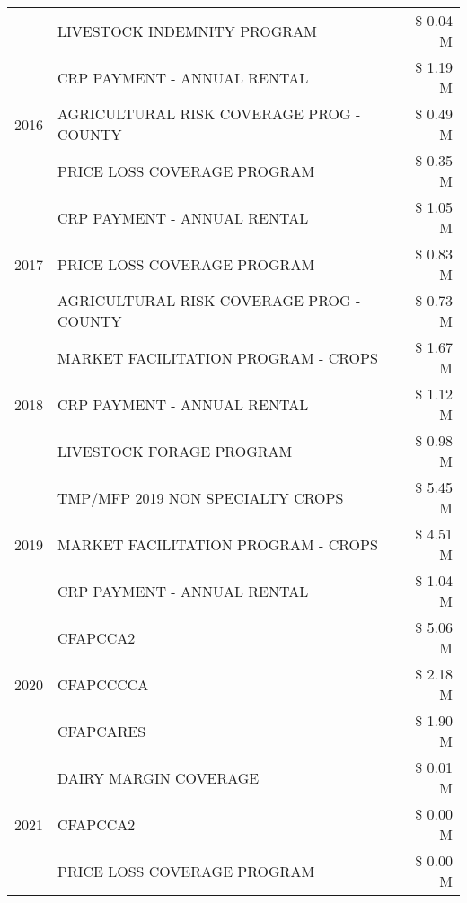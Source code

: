 \begin{tabular}{llr}
 & LIVESTOCK INDEMNITY PROGRAM & \$ 0.04 M \\
\cline{1-3}
\multirow[t]{3}{*}{2016} & CRP PAYMENT - ANNUAL RENTAL & \$ 1.19 M \\
 & AGRICULTURAL RISK COVERAGE PROG - COUNTY & \$ 0.49 M \\
 & PRICE LOSS COVERAGE PROGRAM & \$ 0.35 M \\
\cline{1-3}
\multirow[t]{3}{*}{2017} & CRP PAYMENT - ANNUAL RENTAL & \$ 1.05 M \\
 & PRICE LOSS COVERAGE PROGRAM & \$ 0.83 M \\
 & AGRICULTURAL RISK COVERAGE PROG - COUNTY & \$ 0.73 M \\
\cline{1-3}
\multirow[t]{3}{*}{2018} & MARKET FACILITATION PROGRAM - CROPS & \$ 1.67 M \\
 & CRP PAYMENT - ANNUAL RENTAL & \$ 1.12 M \\
 & LIVESTOCK FORAGE PROGRAM & \$ 0.98 M \\
\cline{1-3}
\multirow[t]{3}{*}{2019} & TMP/MFP 2019 NON SPECIALTY CROPS & \$ 5.45 M \\
 & MARKET FACILITATION PROGRAM - CROPS & \$ 4.51 M \\
 & CRP PAYMENT - ANNUAL RENTAL & \$ 1.04 M \\
\cline{1-3}
\multirow[t]{3}{*}{2020} & CFAPCCA2 & \$ 5.06 M \\
 & CFAPCCCCA & \$ 2.18 M \\
 & CFAPCARES & \$ 1.90 M \\
\cline{1-3}
\multirow[t]{3}{*}{2021} & DAIRY MARGIN COVERAGE & \$ 0.01 M \\
 & CFAPCCA2 & \$ 0.00 M \\
 & PRICE LOSS COVERAGE PROGRAM & \$ 0.00 M \\
\cline{1-3}
\bottomrule
\end{tabular}
